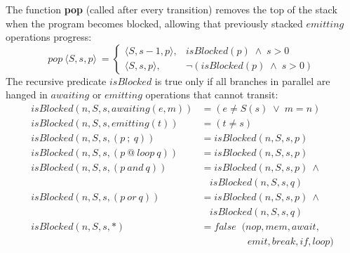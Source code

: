 \documentclass{acm_proc_article-sp}
\newcommand{\LL}{\langle}
\newcommand{\RR}{\rangle}
\newcommand{\1}{\;}
\newcommand{\2}{\;\;}
\newcommand{\3}{\;\;\;}
\newcommand{\5}{\;\;\;\;\;}
\begin{document}
The function \textbf{pop} (called after every transition) removes the top of 
the stack when the program becomes blocked, allowing that previously stacked 
$emitting$ operations progress:
%
\[
pop~\LL S, s, p \RR~ =
\begin{cases}
    \LL S, s-1, p \RR, &        isBlocked(p) \1\wedge\1 s>0     \\
    \LL S, s,   p \RR, & \neg ( isBlocked(p) \1\wedge\1 s>0 )
\end{cases}
\]
%
The recursive predicate $isBlocked$ is true only if all branches in parallel 
are hanged in $awaiting$ or $emitting$ operations that cannot transit:
%
{\small
\begin{align*}
  isBlocked(n,S,s, awaiting(e,m)) &= (e \neq S(s) \1\vee\1 m = n)   \\
  isBlocked(n,S,s, emitting(t))   &= (t \neq s)                     \\
  isBlocked(n,S,s, (p~;~q))       &= isBlocked(n,S,s,p)             \\
  isBlocked(n,S,s, (p~@~loop~q))  &= isBlocked(n,S,s,p)             \\
  isBlocked(n,S,s, (p~and~q))     &= isBlocked(n,S,s,p)~\wedge \\
                                     &~~~~isBlocked(n,S,s,q)             \\
  isBlocked(n,S,s, (p~or~q))      &= isBlocked(n,S,s,p)~\wedge \\
                                     &~~~~isBlocked(n,S,s,q)             \\
  isBlocked(n,S,s, *)             &= false \2  (nop,mem,await,      \\
                                  &    \5\5\5\2 emit,break,if,loop)   %
\end{align*}
}%
%
\begin{comment}
The first two cases query the $awaiting$ and $emitting$ operations to check if 
they are blocked.
Note that the test predicates are reversed in comparison to the semantic rules 
\textbf{awaiting} and \textbf{emitting} (i.e. they test when \emph{not} to 
advance).
Note also that $nop$ is not considered a blocked operation.

An emitted event remains at the top of the stack while there are matching 
$awaiting$ operations---only after the $isBlocked$ predicate becomes true that 
the $pop$ function takes effect.
This behavior provides the desired broadcast communication for events.
\end{comment}
\end{document}
